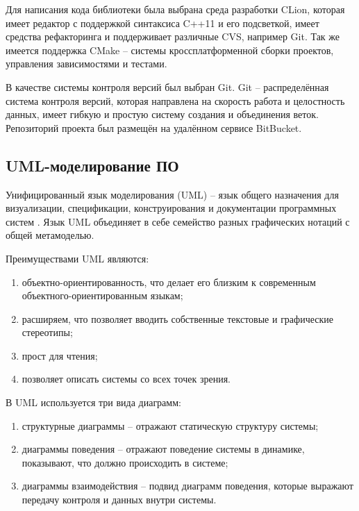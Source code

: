 Для написания кода библиотеки была выбрана среда разработки CLion, которая имеет редактор с поддержкой синтаксиса C++11 и его подсветкой, имеет средства рефакторинга и поддерживает различные CVS, например Git. Так же имеется поддержка CMake -- системы кроссплатформенной сборки проектов, управления зависимостями и тестами.

В качестве системы контроля версий был выбран Git. Git -- распределённая система контроля версий, которая направлена на скорость работа и целостность данных, имеет гибкую и простую систему создания и объединения веток. Репозиторий проекта был размещён на удалённом сервисе BitBucket.
%

\subsection{UML-моделирование ПО}

Унифицированный язык моделирования (UML) -- язык общего назначения для визуализации, спецификации, конструирования и документации программных систем \cite{UML_USER_GUIDE_2ND}. Язык UML объединяет в себе семейство разных графических нотаций с общей метамоделью. 

Преимуществами UML являются:

\begin{enumerate}
    \item объектно-ориентированность, что делает его близким к современным объектного-ориентированным языкам;
    \item расширяем, что позволяет вводить собственные текстовые и графические стереотипы;
    \item прост для чтения;
    \item позволяет описать системы со всех точек зрения.
\end{enumerate}

В UML используется три вида диаграмм:

\begin{enumerate}
    \item структурные диаграммы -- отражают статическую структуру системы;
    \item диаграммы поведения -- отражают поведение системы в динамике, показывают, что должно происходить в системе;
    \item диаграммы взаимодействия -- подвид диаграмм поведения, которые выражают передачу контроля и данных внутри системы.
\end{enumerate} 


